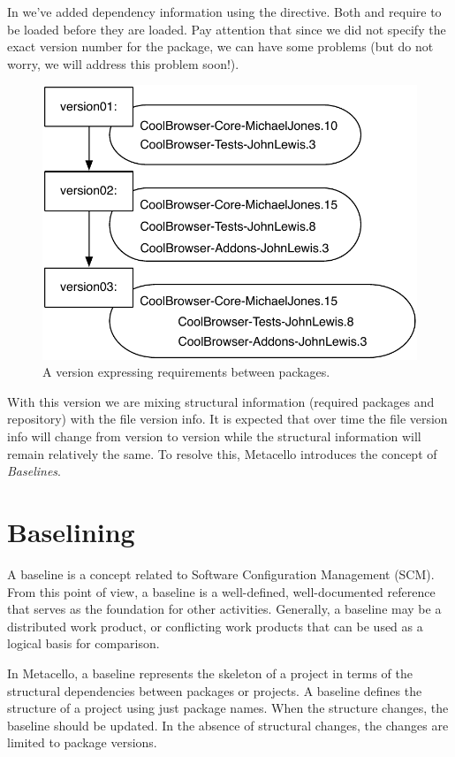 \documentclass[a4paper,10pt,twoside]{book}
\begin{document}
In  we've added dependency information using the  directive.
Both  and   require  to be loaded before they are loaded. Pay attention that since we did not specify the exact version number for the  package, we can have some problems (but do not worry, we will address this problem soon!).

\begin{figure}
\begin{center}
\includegraphics[width=0.6\linewidth]{version03}
\caption{A version expressing requirements between packages.\label{fig:version03}}
\end{center}
\end{figure} 


With this version we are mixing structural information (required packages and repository) with the file version info. It is expected that over time the file version info will change from
version to version while the structural information will remain relatively the same. To resolve this, Metacello introduces the concept of {\em Baselines}.


\section{Baselining}
A baseline is a concept related to Software Configuration Management (SCM). From this point of view, a baseline is a well-defined, well-documented reference that serves as the foundation for other activities. Generally, a baseline may be a distributed work product, or conflicting work products that can be used as a logical basis for comparison. 

In Metacello, a baseline represents the skeleton of a project in terms of the structural dependencies between packages or projects. A baseline defines the structure of a project using just package names. When the structure changes, the baseline should be updated. In the absence of structural changes, the changes are limited to package versions.
\end{document}

